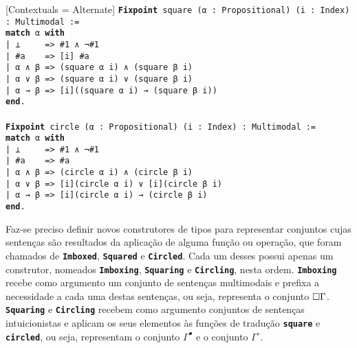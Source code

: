 \vspace{0.5\baselineskip}
\begin{tcolorbox}[enhanced jigsaw, breakable, sharp corners, colframe=black, colback=white, boxrule=0.5pt, left=1.5mm, right=1.5mm, top=1.5mm, bottom=1.5mm]
\setmonofont{Fira Code}[Contextuals = Alternate]
\noindent
\texttt
{\noindent\footnotesize\textbf{Fixpoint} square (α : Propositional) (i : Index) : Multimodal :=\\
\textbf{match} α \textbf{with}\\
| ⊥\ \ \ \ \ => \#1 ∧ ¬\#1\\
| \#a\ \ \ \ => [i] \#a\\
| α ∧ β => (square α i) ∧ (square β i)\\
| α ∨ β => (square α i) ∨ (square β i)\\
| α → β => [i]((square α i) → (square β i))\\
\textbf{end}.\\
\\
\textbf{Fixpoint} circle (α : Propositional) (i : Index) : Multimodal :=\\
\textbf{match} α \textbf{with}\\
| ⊥\ \ \ \ \ => \#1 ∧ ¬\#1\\
| \#a\ \ \ \ => \#a\\
| α ∧ β => (circle α i) ∧ (circle β i)\\
| α ∨ β => [i](circle α i) ∨ [i](circle β i)\\
| α → β => [i](circle α i) → (circle β i)\\
\textbf{end}.
}
\end{tcolorbox}

\vspace{0.5\baselineskip}
Faz-se preciso definir novos construtores de tipos para representar conjuntos cujas sentenças são resultados da aplicação de alguma função ou operação, que foram chamados de \texttt{\textbf{Imboxed}}, \texttt{\textbf{Squared}} e \texttt{\textbf{Circled}}.
Cada um desses possui apenas um construtor, nomeados \texttt{\textbf{Imboxing}}, \texttt{\textbf{Squaring}} e \texttt{\textbf{Circling}}, nesta ordem.
\texttt{\textbf{Imboxing}} recebe como argumento um conjunto de sentenças multimodais e prefixa a necessidade a cada uma destas sentenças, ou seja, representa o conjunto $\Box\Gamma$.
\texttt{\textbf{Squaring}} e \texttt{\textbf{Circling}} recebem como argumento conjuntos de sentenças intuicionistas e aplicam os seus elementos às funções de tradução \texttt{\textbf{square}} e \texttt{\textbf{circled}}, ou seja, representam o conjunto $\Gamma^\bullet$ e o conjunto $\Gamma^\circ$.

